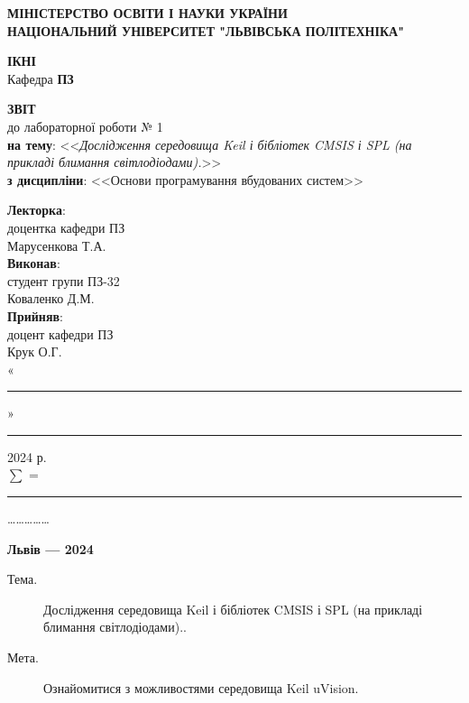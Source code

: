 \documentclass[oneside,14pt]{extarticle}
\newcommand\subject{Основи програмування вбудованих систем}
\newcommand\lecturer{доцентка кафедри ПЗ\\Марусенкова Т.А.}
\newcommand\teacher{доцент кафедри ПЗ\\Крук О.Г.}
\newcommand\mygroup{ПЗ-32}
\newcommand\lab{1}
\newcommand\theme{Дослідження середовища Keil і бібліотек CMSIS і SPL (на прикладі блимання світлодіодами).}
\newcommand\purpose{Ознайомитися з можливостями середовища Keil uVision}
\begin{document}
\begin{normalsize}
	\begin{titlepage}
		\thispagestyle{empty}
		\begin{center}
			\textbf{МІНІСТЕРСТВО ОСВІТИ І НАУКИ УКРАЇНИ\\
				НАЦІОНАЛЬНИЙ УНІВЕРСИТЕТ "ЛЬВІВСЬКА ПОЛІТЕХНІКА"}
		\end{center}
		\begin{flushright}
			\textbf{ІКНІ}\\
			Кафедра \textbf{ПЗ}
		\end{flushright}
		\vspace{80pt}
		\begin{center}
			\textbf{ЗВІТ}\\
			\vspace{10pt}
			до лабораторної роботи № \lab\\
			\textbf{на тему}: <<\textit{\theme}>>\\
			\textbf{з дисципліни}: <<\subject>>
		\end{center}
		\vspace{80pt}
		\begin{flushright}
			
			\textbf{Лекторка}:\\
			\lecturer\\
			\vspace{28pt}
			\textbf{Виконав}:\\
			
			студент групи \mygroup\\
			Коваленко Д.М.\\
			\vspace{28pt}
			\textbf{Прийняв}:\\
			
			\teacher\\
			
			\vspace{28pt}
			«\rule{1cm}{0.15mm}» \rule{1.5cm}{0.15mm} 2024 р.\\
			$\sum$ = \rule{1cm}{0.15mm}……………\\
			
		\end{flushright}
		\vspace{\fill}
		\begin{center}
			\textbf{Львів — 2024}
		\end{center}
	\end{titlepage}
		
	\begin{description}
		\item[Тема.] \theme.
		\item[Мета.] \purpose.
	\end{description}


\end{normalsize}
\end{document}
